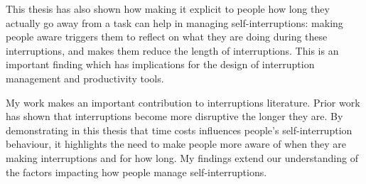 This thesis has also shown how making it explicit to people how long they actually go away from a task can help in managing self-interruptions: making people aware triggers them to reflect on what they are doing during these interruptions, and makes them reduce the length of interruptions. This is an important finding which has implications for the design of interruption management and productivity tools. %

My work makes an important contribution to interruptions literature. Prior work has shown that interruptions become more disruptive the longer they are. By demonstrating in this thesis that time costs influences people’s self-interruption behaviour, it highlights the need to make people more aware of when they are making interruptions and for how long. My findings extend our understanding of the factors impacting how people manage self-interruptions. 

